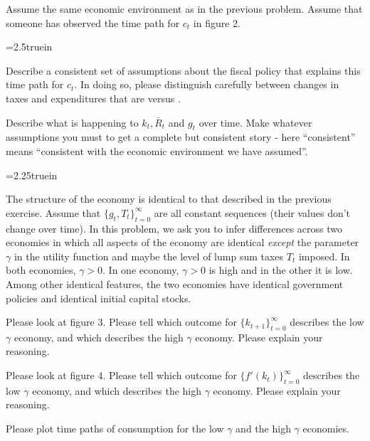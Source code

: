 \medskip
{}
\medskip
\noindent Assume the same economic environment as in the previous  problem. Assume that someone has observed the  time path for $c_t$ in figure 2.
\medskip
{}
\centerline{\epsfxsize=2.5truein}
\caption{Consumption per capita.}
\endfigure
\medskip
{} Describe a consistent set of assumptions about the fiscal policy that explains this time path for
$c_t$. In doing so, please distinguish carefully between changes in taxes and expenditures that are  versus .

\medskip
{} Describe what is happening to $k_t,\bar R_t$ and $g_t$ over time. Make whatever assumptions you must to get a complete but consistent story - here ``consistent'' means ``consistent with the economic environment we have assumed''.


\centerline{\epsfxsize=2.25truein}
\caption{Capital stock as function of time in two economies with different values of $\gamma$.}
\endfigure

\medskip
{}
\medskip
\noindent
 The structure of the  economy is identical to that described in the previous exercise.
Assume that $\{g_t, T_t\}_{t=0}^\infty $ are all constant sequences (their values don't change over time).
In this problem, we ask you to infer  differences
across two economies in which all aspects of the economy are identical {\it except} the parameter $\gamma$ in the utility function and maybe the level
of lump sum taxes $T_t$ imposed.  In both economies, $\gamma > 0$.  In one economy, $\gamma >0$ is high and in the other it is low.
Among other identical features, the two economies have identical government policies and identical initial capital stocks.\medskip
\medskip

   Please look at figure 3. Please tell which outcome for $\{k_{t+1}\}_{t=0}^\infty$ describes the low $\gamma$ economy, and which describes the high $\gamma$ economy.
Please explain your reasoning.\medskip

   Please look at figure 4. Please tell which outcome for $\{f'(k_t)\}_{t=0}^\infty$ describes the low $\gamma$ economy, and which describes the high $\gamma$ economy.
Please explain your reasoning.
\medskip

 Please plot time paths of consumption for the low $\gamma$ and the high $\gamma$ economies.
\medskip




